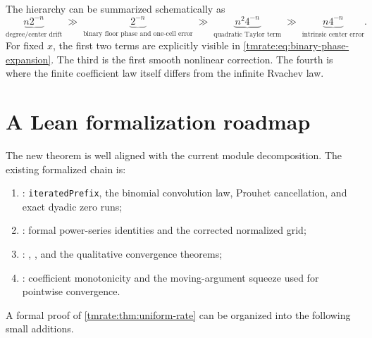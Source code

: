 \documentclass[11pt,oneside]{article}
\theoremstyle{definition}
\theoremstyle{remark}
\begin{document}
The hierarchy can be summarized schematically as
\begin{equation}
 \underbrace{n2^{-n}}_{\text{degree/center drift}}
 \;\gg\;
 \underbrace{2^{-n}}_{\text{binary floor phase and one-cell error}}
 \;\gg\;
 \underbrace{n^2 4^{-n}}_{\text{quadratic Taylor term}}
 \;\gg\;
 \underbrace{n4^{-n}}_{\text{intrinsic center error}}.     \label{tmrate:eq:hierarchy}
\end{equation}
For fixed $x$, the first two terms are explicitly visible in
\eqref{tmrate:eq:binary-phase-expansion}.  The third is the first smooth nonlinear
correction.  The fourth is where the finite coefficient law itself differs from
the infinite Rvachev law.

\section{A Lean formalization roadmap}
\label{tmrate:sec:lean-roadmap}

The new theorem is well aligned with the current module decomposition.
The existing formalized chain is:
\begin{enumerate}
\item {}: \texttt{iteratedPrefix}, the binomial
      convolution law, Prouhet cancellation, and exact dyadic zero runs;
\item {}: formal power-series identities and the
      corrected normalized grid;
\item {}:
      ,
      , and the
      qualitative convergence theorems;
\item {}: coefficient monotonicity and the
      moving-argument squeeze used for pointwise convergence.
\end{enumerate}

A formal proof of \cref{tmrate:thm:uniform-rate} can be organized into the following
small additions.
\end{document}
